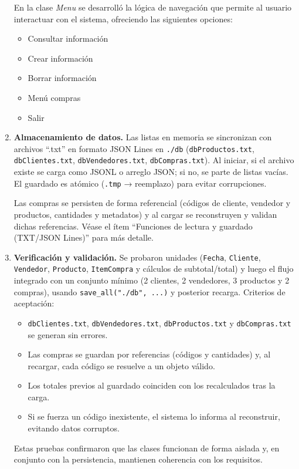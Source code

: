 \documentclass[11pt]{article}
\begin{document}
\begin{enumerate}
En la clase \textit{Menu} se desarrolló la lógica de navegación que permite al usuario interactuar con el sistema, ofreciendo las siguientes opciones:
\begin{itemize}
    \item Consultar información
    \item Crear información
    \item Borrar información
    \item Menú compras
    \item Salir
\end{itemize}


\item \textbf{Almacenamiento de datos.}
Las listas en memoria se sincronizan con archivos ``.txt'' en formato JSON Lines en \texttt{./db} (\texttt{dbProductos.txt}, \texttt{dbClientes.txt}, \texttt{dbVendedores.txt}, \texttt{dbCompras.txt}). Al iniciar, si el archivo existe se carga como JSONL o arreglo JSON; si no, se parte de listas vacías. El guardado es atómico (\texttt{.tmp} → reemplazo) para evitar corrupciones.  

Las compras se persisten de forma referencial (códigos de cliente, vendedor y productos, cantidades y metadatos) y al cargar se reconstruyen y validan dichas referencias. Véase el ítem “Funciones de lectura y guardado (TXT/JSON Lines)” para más detalle.


\item \textbf{Verificación y validación.}
Se probaron unidades (\texttt{Fecha}, \texttt{Cliente}, \texttt{Vendedor}, \texttt{Producto}, \texttt{ItemCompra} y cálculos de subtotal/total) y luego el flujo integrado con un conjunto mínimo (2 clientes, 2 vendedores, 3 productos y 2 compras), usando \texttt{save\_all("./db", ...)} y posterior recarga.  
Criterios de aceptación:
\begin{itemize}
  \item \texttt{dbClientes.txt}, \texttt{dbVendedores.txt}, \texttt{dbProductos.txt} y \texttt{dbCompras.txt} se generan sin errores.
  \item Las compras se guardan por referencias (códigos y cantidades) y, al recargar, cada código se resuelve a un objeto válido.
  \item Los totales previos al guardado coinciden con los recalculados tras la carga.
  \item Si se fuerza un código inexistente, el sistema lo informa al reconstruir, evitando datos corruptos.
\end{itemize}
Estas pruebas confirmaron que las clases funcionan de forma aislada y, en conjunto con la persistencia, mantienen coherencia con los requisitos.



\end{enumerate}
\end{document}
